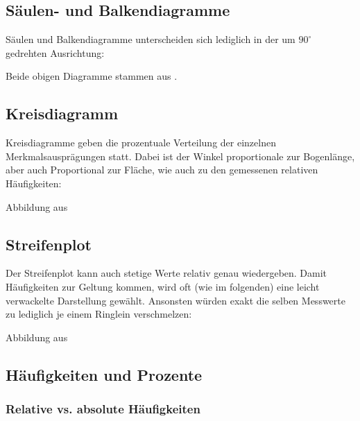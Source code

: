 \subsection{Säulen- und
  Balkendiagramme}
Säulen und Balkendiagramme unterscheiden sich lediglich in der um $90^\circ$ gedrehten Ausrichtung:
\begin{center}
\end{center}
Beide obigen Diagramme stammen aus \cite{marthaler17}.

\subsection{Kreisdiagramm}
Kreisdiagramme geben die prozentuale Verteilung der einzelnen Merkmalsausprägungen statt. Dabei ist der Winkel proportionale zur Bogenlänge, aber auch Proportional zur Fläche, wie auch zu den gemessenen relativen Häufigkeiten:


Abbildung aus \cite{marthaler17}
\newpage

\subsection{Streifenplot}
Der Streifenplot kann auch stetige Werte relativ genau wiedergeben. Damit Häufigkeiten zur Geltung kommen, wird oft (wie im folgenden) eine leicht verwackelte Darstellung gewählt. Ansonsten würden exakt die selben Messwerte zu lediglich je einem Ringlein verschmelzen:


Abbildung aus \cite{marthaler17}
\newpage


\subsection{Häufigkeiten und Prozente}

\subsubsection{Relative vs. absolute Häufigkeiten}

